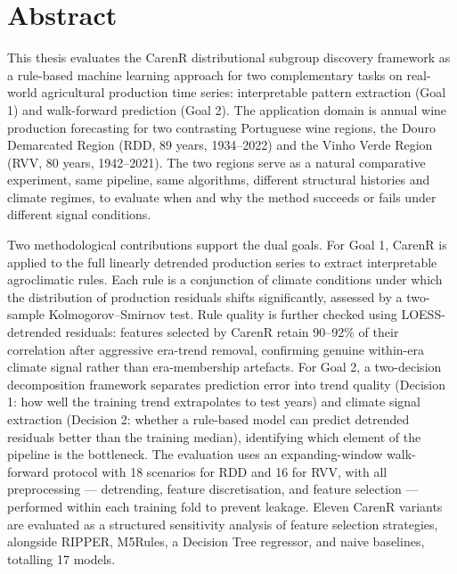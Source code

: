 
\chapter*{Abstract}

This thesis evaluates the CarenR distributional subgroup discovery framework as a rule-based machine learning approach for two complementary tasks on real-world agricultural production time series: interpretable pattern extraction (Goal 1) and walk-forward prediction (Goal 2). The application domain is annual wine production forecasting for two contrasting Portuguese wine regions, the Douro Demarcated Region (RDD, 89 years, 1934--2022) and the Vinho Verde Region (RVV, 80 years, 1942--2021). The two regions serve as a natural comparative experiment, same pipeline, same algorithms, different structural histories and climate regimes, to evaluate when and why the method succeeds or fails under different signal conditions.

Two methodological contributions support the dual goals. For Goal 1, CarenR is applied to the full linearly detrended production series to extract interpretable agroclimatic rules. Each rule is a conjunction of climate conditions under which the distribution of production residuals shifts significantly, assessed by a two-sample Kolmogorov--Smirnov test. Rule quality is further checked using LOESS-detrended residuals: features selected by CarenR retain 90--92\% of their correlation after aggressive era-trend removal, confirming genuine within-era climate signal rather than era-membership artefacts. For Goal 2, a two-decision decomposition framework separates prediction error into trend quality (Decision 1: how well the training trend extrapolates to test years) and climate signal extraction (Decision 2: whether a rule-based model can predict detrended residuals better than the training median), identifying which element of the pipeline is the bottleneck. The evaluation uses an expanding-window walk-forward protocol with 18 scenarios for RDD and 16 for RVV, with all preprocessing --- detrending, feature discretisation, and feature selection --- performed within each training fold to prevent leakage. Eleven CarenR variants are evaluated as a structured sensitivity analysis of feature selection strategies, alongside RIPPER, M5Rules, a Decision Tree regressor, and naive baselines, totalling 17 models.

